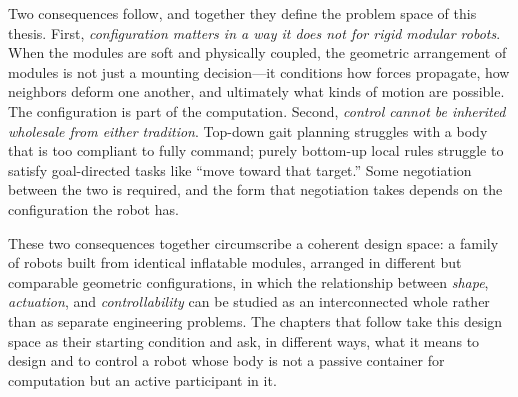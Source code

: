Two consequences follow, and together they define the problem space of this thesis. First, \textit{configuration matters in a way it does not for rigid modular robots}. When the modules are soft and physically coupled, the geometric arrangement of modules is not just a mounting decision---it conditions how forces propagate, how neighbors deform one another, and ultimately what kinds of motion are possible. The configuration is part of the computation. Second, \textit{control cannot be inherited wholesale from either tradition}. Top-down gait planning struggles with a body that is too compliant to fully command; purely bottom-up local rules struggle to satisfy goal-directed tasks like ``move toward that target.'' Some negotiation between the two is required, and the form that negotiation takes depends on the configuration the robot has.

These two consequences together circumscribe a coherent design space: a family of robots built from identical inflatable modules, arranged in different but comparable geometric configurations, in which the relationship between \textit{shape}, \textit{actuation}, and \textit{controllability} can be studied as an interconnected whole rather than as separate engineering problems. The chapters that follow take this design space as their starting condition and ask, in different ways, what it means to design and to control a robot whose body is not a passive container for computation but an active participant in it.
